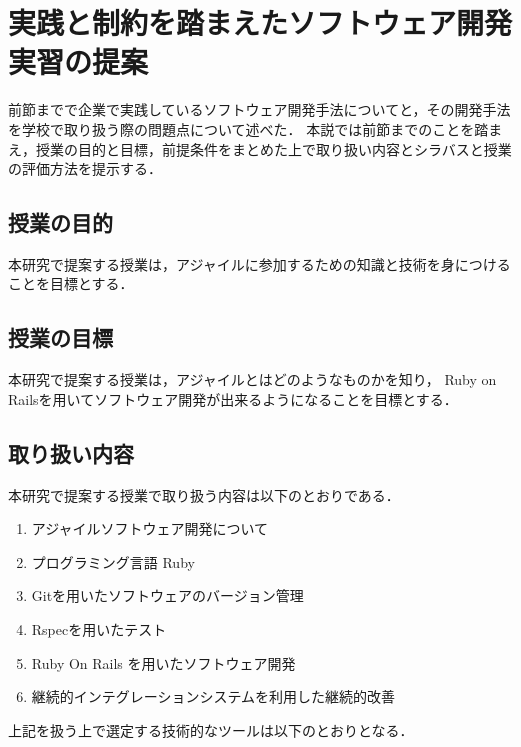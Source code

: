 \section{実践と制約を踏まえたソフトウェア開発実習の提案}

前節までで企業で実践しているソフトウェア開発手法についてと，その開発手法を学校で取り扱う際の問題点について述べた．
本説では前節までのことを踏まえ，授業の目的と目標，前提条件をまとめた上で取り扱い内容とシラバスと授業の評価方法を提示する．

\subsection{授業の目的}

本研究で提案する授業は，アジャイルに参加するための知識と技術を身につけることを目標とする．

\subsection{授業の目標}

本研究で提案する授業は，アジャイルとはどのようなものかを知り， Ruby on Railsを用いてソフトウェア開発が出来るようになることを目標とする．

\subsection{取り扱い内容
  \label{tech-content}
}

本研究で提案する授業で取り扱う内容は以下のとおりである．

\begin{enumerate}
  \item アジャイルソフトウェア開発について
  \item プログラミング言語 Ruby
  \item Gitを用いたソフトウェアのバージョン管理
  \item Rspecを用いたテスト
  \item Ruby On Rails を用いたソフトウェア開発
  \item 継続的インテグレーションシステムを利用した継続的改善
\end{enumerate}

上記を扱う上で選定する技術的なツールは以下のとおりとなる．

